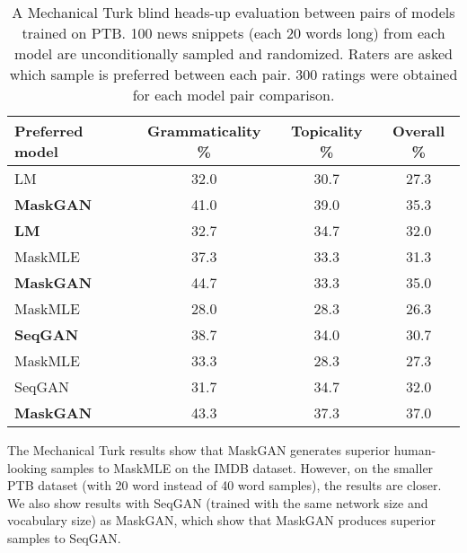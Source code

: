 \begin{table}[h]
  \centering
  \begin{tabular}{lccc}
    \toprule
    Preferred model & Grammaticality \% & Topicality \% & Overall \% \\
    \midrule
    LM & 32.0 & 30.7 & 27.3 \\
    \textbf{MaskGAN} & 41.0 & 39.0 & 35.3 \\
    \midrule
    \textbf{LM} & 32.7 & 34.7 & 32.0 \\
    MaskMLE &  37.3 & 33.3 & 31.3 \\
    \midrule
    \textbf{MaskGAN} & 44.7 & 33.3 & 35.0 \\
    MaskMLE & 28.0 & 28.3 & 26.3 \\
    \midrule
    \textbf{SeqGAN} & 38.7 & 34.0 & 30.7 \\
    MaskMLE & 33.3 & 28.3 & 27.3 \\
    \midrule
    SeqGAN & 31.7 & 34.7 & 32.0 \\
    \textbf{MaskGAN} & 43.3 & 37.3 & 37.0 \\
    \bottomrule
  \end{tabular}
  \caption{A Mechanical Turk blind heads-up evaluation between pairs of models trained on PTB. 100 news snippets (each 20 words long) from each model are unconditionally sampled and randomized. Raters are asked which sample is preferred between each pair. 300 ratings were obtained for each model pair comparison.}
\end{table}

The Mechanical Turk results show that MaskGAN generates superior human-looking samples to MaskMLE on the IMDB dataset. However, on the smaller PTB dataset (with 20 word instead of 40 word samples), the results are closer. We also show results with SeqGAN (trained with the same network size and vocabulary size) as MaskGAN, which show that MaskGAN produces superior samples to SeqGAN.

